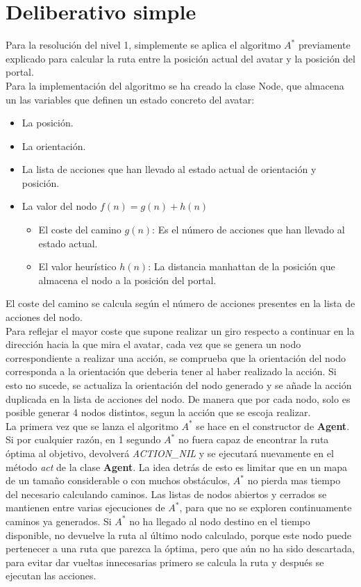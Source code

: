 \section{Deliberativo simple}
Para la resolución del nivel 1, simplemente se aplica el algoritmo $ A^{*} $ previamente explicado para calcular la ruta entre la posición actual del avatar y la posición del portal. \\
Para la implementación del algoritmo se ha creado la clase Node, que almacena un las variables que definen un estado concreto del avatar:
\begin{itemize}
   \item La posición.
   \item La orientación.
   \item La lista de acciones que han llevado al estado actual de orientación y posición.
   \item La valor del nodo $ f(n) = g(n) + h(n) $
   \begin{itemize}
      \item El coste del camino $ g(n) $: Es el número de acciones que han llevado al estado actual.
      \item El valor heurístico $ h(n) $: La distancia manhattan de la posición que almacena el nodo a la posición del portal.
   \end{itemize}
\end{itemize}

El coste del camino se calcula según el número de acciones presentes en la lista de acciones del nodo.\\
Para reflejar el mayor coste que supone realizar un giro respecto a continuar en la dirección hacia la que mira el avatar, cada vez que se genera un nodo correspondiente a realizar una acción, se comprueba que la orientación del nodo corresponda a la orientación que deberia tener al haber realizado la acción.
Si esto no sucede, se actualiza la orientación del nodo generado y se añade la acción duplicada en la lista de acciones del nodo. De manera que por cada nodo, solo es posible generar 4 nodos distintos, segun la acción que se escoja realizar.\\
La primera vez que se lanza el algoritmo $ A^{*} $ se hace en el constructor de \textbf{Agent}. Si por cualquier razón, en 1 segundo $ A^{*} $ no fuera capaz de encontrar la ruta óptima al objetivo, devolverá \emph{ACTION\_NIL} y se ejecutará nuevamente en el método \emph{act} de la clase \textbf{Agent}. La idea detrás de esto es limitar que en un mapa de un tamaño considerable o con muchos obstáculos, $ A^{*} $ no pierda mas tiempo del necesario calculando caminos. Las listas de nodos abiertos y cerrados se mantienen entre varias ejecuciones de $ A^{*} $, para que no se exploren continuamente caminos ya generados. Si $ A^{*} $ no ha llegado al nodo destino en el tiempo disponible, no devuelve la ruta al último nodo calculado, porque este nodo puede pertenecer a una ruta que parezca la óptima, pero que aún no ha sido descartada, para evitar dar vueltas innecesarias primero se calcula la ruta y después se ejecutan las acciones.\\
\\


